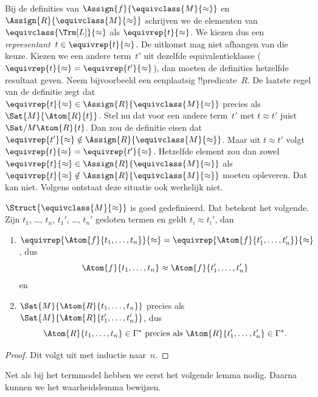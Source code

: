 \documentclass[../../../include/open-logic-section]{subfiles}
\begin{document}
\begin{explain}
Bij de definities van $\Assign{f}{\equivclass{M}{\approx}}$ en
$\Assign{R}{\equivclass{M}{\approx}}$ schrijven we de elementen van
$\equivclass{\Trm[L]}{\approx}$ als $\equivrep{t}{\approx}$. We kiezen
dus een \emph{representant}~$t \in \equivrep{t}{\approx}$. De uitkomst
mag niet afhangen van die keuze. Kiezen we een andere term~$t'$ uit
dezelfde equivalentieklasse
($\equivrep{t}{\approx} = \equivrep{t'}{\approx}$), dan moeten de
definities hetzelfde resultaat geven. Neem bijvoorbeeld een eenplaatsig
!!{predicate}~$R$. De laatste regel van de definitie zegt dat
$\equivrep{t}{\approx} \in \Assign{R}{\equivclass{M}{\approx}}$ precies
als $\Sat{M}{\Atom{R}{t}}$. Stel nu dat voor een andere term~$t'$ met
$t \approx t'$ juist $\Sat/{M}{\Atom{R}{t}}$. Dan zou de definitie eisen
dat $\equivrep{t'}{\approx} \notin
\Assign{R}{\equivclass{M}{\approx}}$. Maar uit $t \approx t'$ volgt
$\equivrep{t}{\approx} = \equivrep{t'}{\approx}$. Hetzelfde element zou
dan zowel $\equivrep{t}{\approx} \in
\Assign{R}{\equivclass{M}{\approx}}$ als $\equivrep{t}{\approx} \notin
\Assign{R}{\equivclass{M}{\approx}}$ moeten opleveren. Dat kan niet.
Volgens  ontstaat deze situatie ook werkelijk
niet.
\end{explain}

\begin{prop}
$\Struct{\equivclass{M}{\approx}}$ is goed gedefinieerd. Dat betekent het
volgende. Zijn $t_1$, \dots, $t_n$, $t_1'$, \dots, $t_n'$ gesloten termen
en geldt $t_i \approx t_i'$, dan
\begin{enumerate}
\item $\equivrep{\Atom{f}{t_1,\dots, t_n}}{\approx} =
    \equivrep{\Atom{f}{t_1',\dots, t_n'}}{\approx}$, dus
  \[
  \Atom{f}{t_1,\dots, t_n} \approx \Atom{f}{t_1',\dots, t_n'}
  \]
  en
\item $\Sat{M}{\Atom{R}{t_1,\dots, t_n}}$ precies als
  $\Sat{M}{\Atom{R}{t_1',\dots, t_n'}}$, dus
  \[
    \Atom{R}{t_1,\dots, t_n} \in \Gamma^* \text{ precies als }
    \Atom{R}{t_1',\dots, t_n'} \in \Gamma^*.
  \]
\end{enumerate}
\end{prop}

\begin{proof}
Dit volgt uit  met inductie naar~$n$.
\end{proof}

Net als bij het termmodel hebben we eerst het volgende lemma nodig. Daarna
kunnen we het waarheidslemma bewijzen.
\end{document}
